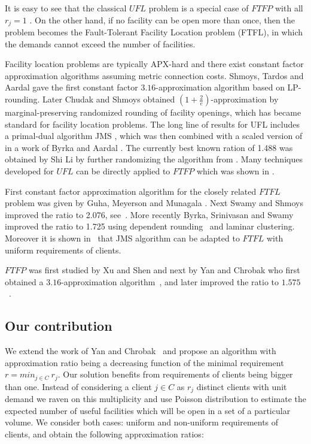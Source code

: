\documentclass{llncs}
\begin{document}
It is easy to see that the classical $UFL$ problem is a special case of $FTFP$ with all $r_j = 1$ . On the other hand, if no facility can be open more than once, then the problem becomes the Fault-Tolerant Facility Location problem (FTFL), in which the demands cannot exceed the number of facilities. 

Facility location problems are typically APX-hard and there exist constant factor approximation algorithms assuming metric connection costs. Shmoys, Tardos and Aardal \cite{Tardos} gave the first constant factor $3.16$-approximation algorithm based on LP-rounding. Later Chudak and Shmoys \cite{Chudak} obtained $(1 + \frac{2}{e})$-approximation by marginal-preserving randomized  rounding of facility openings, which has became standard for facility location problems. The long line of results for UFL includes a primal-dual algorithm JMS \cite{Jain}, which was then combined with a scaled version of \cite{Chudak} in a work of Byrka and Aardal \cite{Aardal}. The currently best known ration of 1.488 was obtained by Shi Li \cite{ShiLi} by further randomizing the algorithm from \cite{Aardal}. Many techniques developed for $UFL$ can be directly applied to $FTFP$ which was shown in \cite{Yan}.

First constant factor approximation algorithm for the closely related $FTFL$ problem was given by Guha, Meyerson and Munagala \cite{Meyerson}. Next Swamy and Shmoys  improved the ratio to 2.076, see~\cite{Swamy}. More recently Byrka, Srinivasan and Swamy~\cite{ftfl_1725} improved the ratio to 1.725 using dependent rounding~\cite{Aravind} and laminar clustering. Moreover it is shown in~\cite{Swamy} that JMS algorithm can be adapted to $FTFL$ with uniform requirements of clients.

$FTFP$ was first studied by Xu and Shen \cite{Xu} and next by Yan and Chrobak who first obtained a $3.16$-approximation algorithm~\cite{Yan_316}, and later improved the ratio to $1.575$~\cite{Yan}.

\subsection{Our contribution}

We extend the work of Yan and Chrobak~\cite{Yan} and propose an algorithm with approximation ratio being a decreasing function of the minimal requirement $r = min_{j \in C}~r_j$. Our solution benefits from requirements of clients being bigger than one. Instead of considering a client $j \in C$ as $r_j$ distinct clients with unit demand we raven on this multiplicity and use Poisson distribution to estimate the expected number of useful facilities which will be open in a set of a particular volume. We consider both cases: uniform and non-uniform requirements of clients, and obtain the following approximation ratios: 
\end{document}
